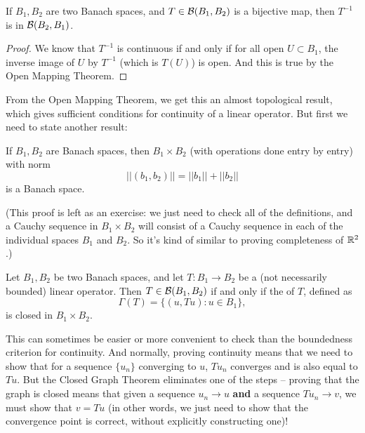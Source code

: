 \begin{corollary}\label{bijectivebounded}
If $B_1, B_2$ are two Banach spaces, and $T \in \mathcal{B}(B_1, B_2)$ is a bijective map, then $T^{-1}$ is in $\mathcal{B}(B_2, B_1)$.
\end{corollary}
\begin{proof}
We know that $T^{-1}$ is continuous if and only if for all open $U \subset B_1$, the inverse image of $U$ by $T^{-1}$ (which is $T(U)$) is open. And this is true by the Open Mapping Theorem.
\end{proof}

From the Open Mapping Theorem, we get this an almost topological result, which gives sufficient conditions for continuity of a linear operator. But first we need to state another result:

\begin{proposition}
If $B_1, B_2$ are Banach spaces, then $B_1 \times B_2$ (with operations done entry by entry) with norm 
\[
    ||(b_1, b_2)|| = ||b_1|| + ||b_2||
\]  
is a Banach space.
\end{proposition}

(This proof is left as an exercise: we just need to check all of the definitions, and a Cauchy sequence in $B_1 \times B_2$ will consist of a Cauchy sequence in each of the individual spaces $B_1$ and $B_2$. So it's kind of similar to proving completeness of $\mathbb R^2$.)

\begin{theorem}
Let $B_1, B_2$ be two Banach spaces, and let $T: B_1 \to B_2$ be a (not necessarily bounded) linear operator. Then $T \in \mathcal{B}(B_1, B_2)$ if and only if the  of $T$, defined as 
\[
    \Gamma(T) = \{(u, Tu): u \in B_1\},
\]
is closed in $B_1 \times B_2$.
\end{theorem}

This can sometimes be easier or more convenient to check than the boundedness criterion for continuity. And normally, proving continuity means that we need to show that for a sequence $\{u_n\}$ converging to $u$, $Tu_n$ converges and is also equal to $Tu$. But the Closed Graph Theorem eliminates one of the steps -- proving that the graph is closed means that given a sequence $u_n \to u$ \textbf{and} a sequence $Tu_n \to v$, we must show that $v = Tu$ (in other words, we just need to show that the convergence point is correct, without explicitly constructing one)!

